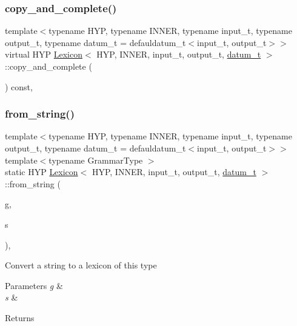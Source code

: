 \subsubsection{\texorpdfstring{copy\+\_\+and\+\_\+complete()}{copy\_and\_complete()}}
{\footnotesize\ttfamily template$<$typename H\+YP, typename I\+N\+N\+ER, typename input\+\_\+t, typename output\+\_\+t, typename datum\+\_\+t = defauldatum\+\_\+t$<$input\+\_\+t, output\+\_\+t$>$$>$ \\
virtual H\+YP \hyperlink{class_lexicon}{Lexicon}$<$ H\+YP, I\+N\+N\+ER, input\+\_\+t, output\+\_\+t, \hyperlink{class_bayesable_a9f1a6c0cd7855550fa10b1a8f13a5867}{datum\+\_\+t} $>$\+::copy\+\_\+and\+\_\+complete (\begin{DoxyParamCaption}{ }\end{DoxyParamCaption}) const\hspace{0.3cm}{\ttfamily [inline]}, {\ttfamily [virtual]}}

\mbox{\label{class_lexicon_a9c9fd97a05a82e4f8b202850f8e8802c}} 
\subsubsection{\texorpdfstring{from\+\_\+string()}{from\_string()}}
{\footnotesize\ttfamily template$<$typename H\+YP, typename I\+N\+N\+ER, typename input\+\_\+t, typename output\+\_\+t, typename datum\+\_\+t = defauldatum\+\_\+t$<$input\+\_\+t, output\+\_\+t$>$$>$ \\
template$<$typename Grammar\+Type $>$ \\
static H\+YP \hyperlink{class_lexicon}{Lexicon}$<$ H\+YP, I\+N\+N\+ER, input\+\_\+t, output\+\_\+t, \hyperlink{class_bayesable_a9f1a6c0cd7855550fa10b1a8f13a5867}{datum\+\_\+t} $>$\+::from\+\_\+string (\begin{DoxyParamCaption}\item[{Grammar\+Type \&}]{g,  }\item[{std\+::string}]{s }\end{DoxyParamCaption})\hspace{0.3cm}{\ttfamily [inline]}, {\ttfamily [static]}}

Convert a string to a lexicon of this type 
\begin{DoxyParams}{Parameters}
{\em g} & \\
\hline
{\em s} & \\
\hline
\end{DoxyParams}
\begin{DoxyReturn}{Returns}

\end{DoxyReturn}
\mbox{\label{class_lexicon_a7b8ca67607285cc14608bd7148953d91}} 
